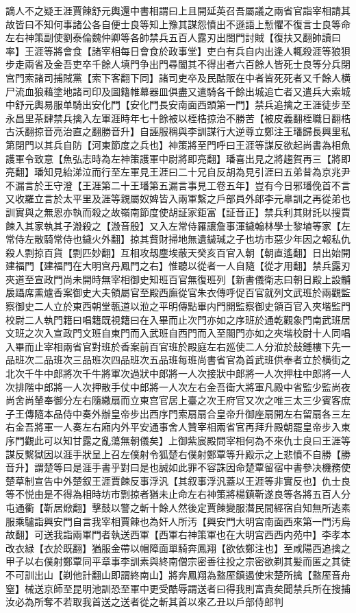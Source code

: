 謫人不之疑王涯賈餗舒元輿還中書相謂曰上且開延英召吾屬議之兩省官詣宰相請其故皆曰不知何事諸公各自便士良等知上豫其謀怨憤出不遜語上慙懼不復言士良等命左右神策副使劉泰倫魏仲卿等各帥禁兵五百人露刃出閤門討賊【復扶又翻帥讀曰率】王涯等將會食【諸宰相每日會食於政事堂】吏白有兵自内出逢人輒殺涯等狼狽步走兩省及金吾吏卒千餘人填門争出門尋闔其不得出者六百餘人皆死士良等分兵閉宫門索諸司捕賊黨【索下客翻下同】諸司吏卒及民酤販在中者皆死死者又千餘人横尸流血狼藉塗地諸司印及圖籍帷幕器皿俱盡又遣騎各千餘出城追亡者又遣兵大索城中舒元輿易服单騎出安化門【安化門長安南面西頭第一門】禁兵追擒之王涯徒步至永昌里茶肆禁兵擒入左軍涯時年七十餘被以桎梏掠治不勝苦【被皮義翻桎職日翻梏古沃翻掠音亮治直之翻勝音升】自誣服稱與李訓謀行大逆尊立鄭注王璠歸長興里私第閉門以其兵自防【河東節度之兵也】神策將至門呼曰王涯等謀反欲起尚書為相魚護軍令致意【魚弘志時為左神策護軍中尉將即亮翻】璠喜出見之將趨賀再三【將即亮翻】璠知見紿涕泣而行至左軍見王涯曰二十兄自反胡為見引涯曰五弟昔為京兆尹不漏言於王守澄【王涯第二十王璠第五漏言事見工卷五年】豈有今日邪璠俛首不言又收羅立言於太平里及涯等親屬奴婢皆入兩軍繫之戶部員外郎李元臯訓之再從弟也訓實與之無恩亦執而殺之故嶺南節度使胡証家鉅富【証音正】禁兵利其財託以搜賈餗入其家執其子溵殺之【溵音殷】又入左常侍羅讓詹事渾鐬翰林學士黎埴等家【左常侍左散騎常侍也鐬火外翻】掠其貲財掃地無遺鐬瑊之子也坊市惡少年因之報私仇殺人剽掠百貨【剽匹妙翻】互相攻刼塵埃蔽天癸亥百官入朝【朝直遙翻】日出始開建福門【建福門在大明宫丹鳳門之右】惟聽以從者一人自隨【從才用翻】禁兵露刃夾道至宣政門尚未開時無宰相御史知班百官無復班列【新書儀衛志曰朝日殿上設黼扆躡席熏爐香案御史大夫領屬官至殿西廡從官朱衣傳呼促百官就列文武班於兩觀監察御史二人立於東西朝堂甎道以涖之平明傳點畢内門開監察御史領百官入夾堦監門校尉二人執門籍曰唱籍既視籍曰在入畢而止次門亦如之序班於通乾觀象門南武班居文班之次入宣政門文班自東門而入武班自西門而入至閤門亦如之夾堦校尉十人同唱入畢而止宰相兩省官對班於香案前百官班於殿庭左右廵使二人分涖於鼔鍾樓下先一品班次二品班次三品班次四品班次五品班每班尚書省官為首武班供奉者立於横街之北次千牛中郎將次千牛將軍次過狀中郎將一人次接狀中郎將一人次押柱中郎將一人次排階中郎將一人次押散手仗中郎將一人次左右金吾衛大將軍凡殿中省監少監尚夜尚舍尚輦奉御分左右隨繖扇而立東宫官居上臺之次王府官又次之唯三太三少賓客庶子王傳隨本品侍中奏外辦皇帝步出西序門索扇扇合皇帝升御座扇開左右留扇各三左右金吾將軍一人奏左右廂内外平安通事舍人贊宰相兩省官再拜升殿朝罷皇帝步入東序門觀此可以知甘露之亂蕩無朝儀矣】上御紫宸殿問宰相何為不來仇士良曰王涯等謀反繫獄因以涯手狀呈上召左僕射令狐楚右僕射鄭覃等升殿示之上悲憤不自勝【勝音升】謂楚等曰是涯手書乎對曰是也誠如此罪不容誅因命楚覃留宿中書參决機務使楚草制宣告中外楚叙王涯賈餗反事浮汎【其叙事浮汎蓋以王涯等非實反也】仇士良等不悦由是不得為相時坊市剽掠者猶未止命左右神策將楊鎮靳遂良等各將五百人分屯通衢【靳居焮翻】擊鼓以警之斬十餘人然後定賈餗變服潛民間經宿自知無所逃素服乘驢詣興安門自言我宰相賈餗也為奸人所汚【興安門大明宫南面西來第一門汚烏故翻】可送我詣兩軍門者執送西軍【西軍右神策軍也在大明宫西西内苑中】李孝本改衣緑【衣於既翻】猶服金帶以帽障面單騎奔鳳翔【欲依鄭注也】至咸陽西追擒之甲子以右僕射鄭覃同平章事李訓素與終南僧宗密善往投之宗密欲剃其髪而匿之其徒不可訓出山【剃他計翻山即謂終南山】將奔鳳翔為盩厔鎮遏使宋楚所擒【盩厔音舟窒】械送京師至昆明池訓恐至軍中更受酷辱謂送者曰得我則富貴矣聞禁兵所在搜捕汝必為所奪不若取我首送之送者從之斬其首以來乙丑以戶部侍郎判